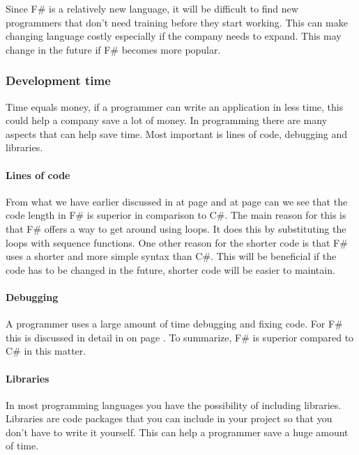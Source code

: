\documentclass[12pt, a4paper]{article}
\begin{document}
Since F\# is a relatively new language, it will be difficult to find new programmers that don't need training before they start working. This can make changing language costly especially if the company needs to expand. This may change in the future if F\# becomes more popular.

\newpage
\subsubsection{Development time}
\label{developmentTime}
Time equals money, if a programmer can write an application in less time, this could help a company save a lot of money. In programming there are many aspects that can help save time. Most important is lines of code, debugging and libraries. 

\paragraph{Lines of code}

From what we have earlier discussed in  at page \pageref{linesOfCode} and  at page \pageref{Testimonials} can we see that the code length in F\# is superior in comparison to C\#. The main reason for this is that F\# offers a way to get around using loops. It does this by substituting the loops with sequence functions. One other reason for the shorter code is that F\# uses a shorter and more simple syntax than C\#. This will be beneficial if the code has to be changed in the future, shorter code will be easier to maintain.

\paragraph{Debugging}

A programmer uses a large amount of time debugging and fixing code. For F\# this is discussed in detail in  on page \pageref{debug}. To summarize, F\# is superior compared to C\# in this matter.

\paragraph{Libraries}

In most programming languages you have the possibility of including libraries. Libraries are code packages that you can include in your project so that you don't have to write it yourself. This can help a programmer save a huge amount of time.\\
\end{document}
